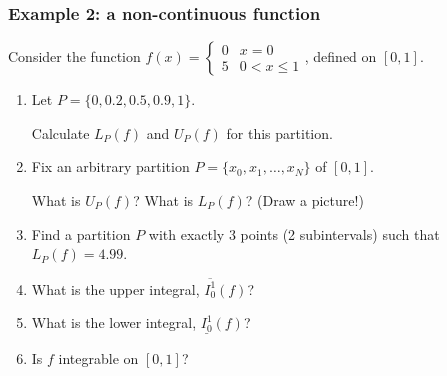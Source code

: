 \begin{frame}[t]
	\fontsize{13}{13}\selectfont
	\frametitle{Example 2: a non-continuous function}

	Consider the function \; $\displaystyle f(x) =
	\begin{cases}
		0 & x = 0        \\
		5 & 0 < x \leq 1
	\end{cases}$, \;defined on $[0,1]$.

	\begin{enumerate}
		\item Let $\displaystyle P = \{0, 0.2, 0.5, 0.9, 1 \}$.
			\vspace{.1cm}

			Calculate $\displaystyle L_{P}(f)$ and $\displaystyle U_{P}(f)$ for this partition.
			\vspace{.1cm}

		\item Fix an arbitrary partition $P = \{x_{0}, x_{1}, \dots, x_{N}\}$ of $[0,
			1]$. \\
			\vspace{.1cm}

			What is $U_{P}(f)$? What is $\displaystyle L_{P}(f)$? (Draw a picture!)
			\vspace{.1cm}

		\item Find a partition $P$ with exactly 3 points (2 subintervals) such that $\displaystyle
			L_{P}(f) = 4.99$.

		\item What is the upper integral, $\overline{I_0^1}(f)$?

		\item What is the lower integral, $\underline{I_0^1}(f)$?

		\item Is $f$ integrable on $[0,1]$?
	\end{enumerate}
\end{frame}

